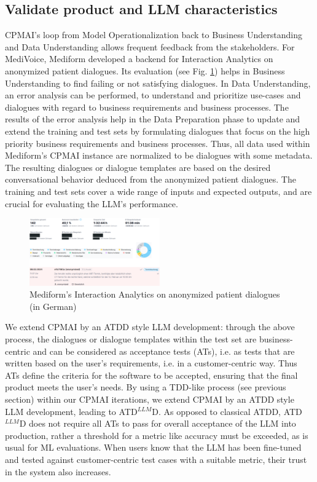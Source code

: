 \documentclass[twocolumn]{article}
\newcommand{\ATDLLMD}{ATD$^{LLM}$D}%
\begin{document}
\subsection{Validate product and LLM characteristics}

CPMAI’s loop from Model Operationalization back to Business Understanding and Data Understanding allows frequent feedback from the stakeholders. For MediVoice, Mediform developed a backend for Interaction Analytics on anonymized patient dialogues. Its evaluation (see Fig. \ref{fig:interactionanalytics}) helps in Business Understanding to find failing or not satisfying dialogues. In Data Understanding, an error analysis can be performed, to understand and prioritize use-cases and dialogues with regard to business requirements and business processes. The results of the error analysis help in the Data Preparation phase to update and extend the training and test sets by formulating dialogues that focus on the high priority business requirements and business processes. Thus, all data used within Mediform’s CPMAI instance are normalized to be dialogues with some metadata. The resulting dialogues or dialogue templates are based on the desired conversational behavior deduced from the anonymized patient dialogues. The training and test sets cover a wide range of inputs and expected outputs, and are crucial for evaluating the LLM’s performance.

\begin{figure}[hbt!]
  \begin{center}
\includegraphics[width=0.5\textwidth]{figures/InteractionAnalytics}
  \vspace{-8mm}
\caption{Mediform’s Interaction Analytics on anonymized patient dialogues (in German)}
\label{fig:interactionanalytics}
\end{center}
\end{figure}

We extend CPMAI by an ATDD style LLM development: through the above process, the dialogues or dialogue templates within the test set are business-centric and can be considered as acceptance tests (ATs), i.e. as tests that are written based on the user’s requirements, i.e. in a customer-centric way. Thus ATs define the criteria for the software to be accepted, ensuring that the final product meets the user's needs. By using a TDD-like process (see previous section) within our CPMAI iterations, we extend CPMAI by an ATDD style LLM development, leading to \ATDLLMD{}. As opposed to classical ATDD, \ATDLLMD{} does not require all ATs to pass for overall acceptance of the LLM into production, rather a threshold for a metric like accuracy must be exceeded, as is usual for ML evaluations. When users know that the LLM has been fine-tuned and tested against customer-centric test cases with a suitable metric, their trust in the system also increases.
\end{document}
